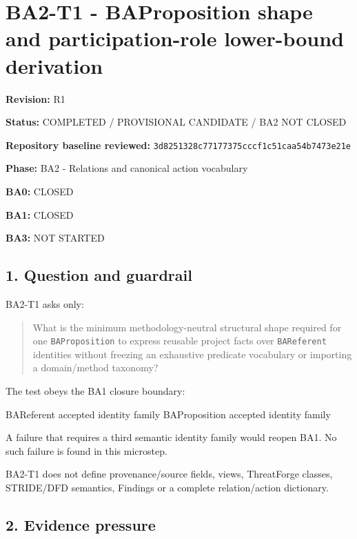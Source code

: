 \documentclass[
  10pt,
  letterpaper,
]{article}
\author{}
\date{}
\newenvironment{Shaded}{}{}
\newcommand{\NormalTok}[1]{#1}
\begin{document}
\section{BA2-T1 - BAProposition shape and participation-role lower-bound
derivation}\label{ba2-t1---baproposition-shape-and-participation-role-lower-bound-derivation}

\textbf{Revision:} R1

\textbf{Status:} COMPLETED / PROVISIONAL CANDIDATE / BA2 NOT CLOSED

\textbf{Repository baseline reviewed:}
\texttt{3d8251328c77177375cccf1c51caa54b7473e21e}

\textbf{Phase:} BA2 - Relations and canonical action vocabulary

\textbf{BA0:} CLOSED

\textbf{BA1:} CLOSED

\textbf{BA3:} NOT STARTED

\subsection{1. Question and guardrail}\label{question-and-guardrail}

BA2-T1 asks only:

\begin{quote}
What is the minimum methodology-neutral structural shape required for
one \texttt{BAProposition} to express reusable project facts over
\texttt{BAReferent} identities without freezing an exhaustive predicate
vocabulary or importing a domain/method taxonomy?
\end{quote}

The test obeys the BA1 closure boundary:

\begin{Shaded}
\begin{Highlighting}[]
\NormalTok{BAReferent     accepted identity family}
\NormalTok{BAProposition  accepted identity family}
\end{Highlighting}
\end{Shaded}

A failure that requires a third semantic identity family would reopen
BA1. No such failure is found in this microstep.

BA2-T1 does not define provenance/source fields, views, ThreatForge
classes, STRIDE/DFD semantics, Findings or a complete relation/action
dictionary.

\subsection{2. Evidence pressure}\label{evidence-pressure}
\end{document}
